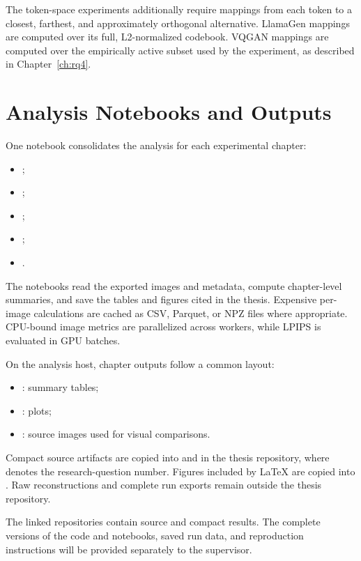 The token-space experiments additionally require mappings from each token to a
closest, farthest, and approximately orthogonal alternative. LlamaGen mappings
are computed over its full, L2-normalized codebook. VQGAN mappings are computed
over the empirically active subset used by the experiment, as described in
Chapter~\ref{ch:rq4}.

\section{Analysis Notebooks and Outputs}
\label{sec:appendix_notebook_analysis}

One notebook consolidates the analysis for each experimental chapter:
\begin{itemize}
    \item {};
    \item {};
    \item {};
    \item {};
    \item {}.
\end{itemize}
The notebooks read the exported images and metadata, compute chapter-level
summaries, and save the tables and figures cited in the thesis. Expensive
per-image calculations are cached as CSV, Parquet, or NPZ files where
appropriate. CPU-bound image metrics are parallelized across workers, while
LPIPS is evaluated in GPU batches.

On the analysis host, chapter outputs follow a common layout:
\begin{itemize}
    \item {}: summary tables;
    \item {}: plots;
    \item {}: source images used for
    visual comparisons.
\end{itemize}
Compact source artifacts are copied into  and
 in the thesis repository, where  denotes
the research-question number. Figures included by LaTeX are copied into
. Raw reconstructions and complete run exports remain outside the
thesis repository.

The linked repositories contain source and compact results. The complete
versions of the code and notebooks, saved run data, and reproduction
instructions will be provided separately to the supervisor.

